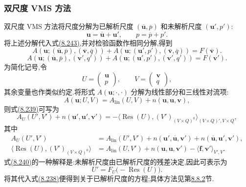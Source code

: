 \subsubsection{双尺度 VMS 方法}\label{subsubsec:vms-two-scale}

\begin{note}
\label{note:vms-two-scale-basic-approach}
双尺度 VMS 方法将尺度分解为已解析尺度 $(\overline{\bm{u}},\overline p)$ 和未解析尺度 $(\bm{u}',p')$:
\[
 \bm{u}=\overline{\bm{u}}+\bm{u}',\qquad
 p=\overline p+p'.
\]
将上述分解代入式\hyperref[eq:variational-navier-stokes-weak-form]{(8.243)},并对检验函数作相同分解,得到
\begin{equation}\label{eq:vms-two-scale-decomposition-1}
 A(\bm{u};(\overline{\bm{u}},\overline p),
                  (\overline{\bm{v}},\overline q))
 +A(\bm{u};(\bm{u}',p'),
                  (\overline{\bm{v}},\overline q))
 =F(\overline{\bm{v}}).
\end{equation}
\begin{equation}\label{eq:vms-two-scale-decomposition-2}
 A(\bm{u};(\overline{\bm{u}},\overline p),(\bm{v}',q'))
 +A(\bm{u};(\bm{u}',p'),(\bm{v}',q'))=F(\bm{v}').
\end{equation}
为简化记号,令
\[
 U=\begin{pmatrix}\bm{u}\\p\end{pmatrix},\qquad
 V=\begin{pmatrix}\bm{v}\\q\end{pmatrix},
\]
其余变量也作类似约定.将形式 $A(\bm{u};\cdot,\cdot)$ 分解为线性部分和三线性对流项:
\[
 A(\bm{u};U,V)=A_{\mathrm{lin}}(U,V)+n(\bm{u},\bm{u},\bm{v}),
\]
则式\hyperref[eq:vms-two-scale-decomposition-2]{(8.239)}可写为
\begin{equation}\label{eq:vms-two-scale-unresolved-equation}
 A_U(U',V')+n(\bm{u}',\bm{u}',\bm{v}')
 =-\langle\operatorname{Res}(U),(V')_{(V\times Q)^0}\rangle_{(V\times Q)',V\times Q},
\end{equation}
其中
\[
\begin{aligned}
 A_U(U',V')
 &=A_{\mathrm{lin}}(U',V')
   +n(\bm{u}',\overline{\bm{u}},\bm{v}')
   +n(\overline{\bm{u}},\bm{u}',\bm{v}'),\\
 \langle\operatorname{Res}(U),(V')_{(V\times Q)^0}\rangle
 &=A_{\mathrm{lin}}(U,V')
   +n(\bm{u},\bm{u},\bm{v}')
   -\langle\bm{f},\bm{v}'\rangle_{V',V}.
\end{aligned}
\]
式\hyperref[eq:vms-two-scale-unresolved-equation]{(8.240)}的一种解释是:未解析尺度由已解析尺度的残差决定,因此可表示为
\begin{equation}\label{eq:vms-two-scale-unresolved-operator}
 U'=F_U\bigl(-\operatorname{Res}(U)\bigr).
\end{equation}
将其代入式\hyperref[eq:vms-two-scale-decomposition-1]{(8.238)}便得到关于已解析尺度的方程;具体方法见第\hyperref[subsec:vms-residual-based-method]{8.8.2}节.


\end{note}
